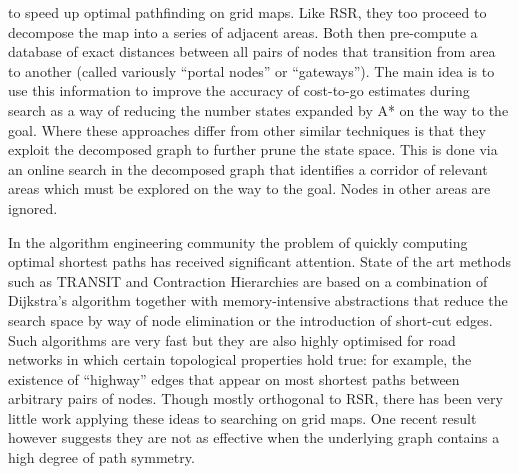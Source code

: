 to speed up optimal pathfinding on grid maps.  Like RSR, they too proceed to
decompose the map into a series of adjacent areas.  Both then pre-compute a
database of exact distances between all pairs of nodes that transition from area
to another (called variously ``portal nodes'' or ``gateways'').  The main idea
is to use this information to improve the accuracy of cost-to-go estimates
during search as a way of reducing the number states expanded by A* on the way
to the goal. Where these approaches differ from other similar techniques
\cite{sturtevant09,felner09} is that they exploit the decomposed graph to
further prune the state space. This is done via an online search in the
decomposed graph that identifies a corridor of relevant areas which must be 
explored on the way to the goal. Nodes in other areas are ignored.
\par
In the algorithm engineering community the problem of quickly computing optimal
shortest paths has received significant attention.  State of the art methods
such as TRANSIT \cite{bast06} and Contraction Hierarchies \cite{geisberger08}
are based on a combination of Dijkstra's algorithm together with
memory-intensive abstractions that reduce the search space by way of node
elimination or the introduction of short-cut edges.  Such algorithms are very
fast but they are also highly optimised for road networks in which certain
topological properties hold true: for example, the existence of ``highway''
edges that appear on most shortest paths between arbitrary pairs of nodes.
Though mostly orthogonal to RSR, there has been very little work applying these
ideas to searching on grid maps. One recent result however \cite{sturtevant10}
suggests they are not as effective when the underlying graph contains a high
degree of path symmetry.
